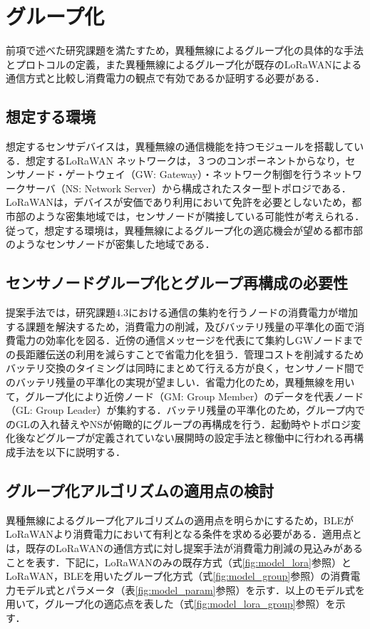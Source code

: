 \section{グループ化}
前項で述べた研究課題を満たすため，異種無線によるグループ化の具体的な手法とプロトコルの定義，また異種無線によるグループ化が既存のLoRaWANによる通信方式と比較し消費電力の観点で有効であるか証明する必要がある．

\subsection{想定する環境}
想定するセンサデバイスは，異種無線の通信機能を持つモジュールを搭載している．想定するLoRaWAN ネットワークは，３つのコンポーネントからなり，センサノード・ゲートウェイ（GW: Gateway）・ネットワーク制御を行うネットワークサーバ（NS: Network Server）から構成されたスター型トポロジである．LoRaWANは，デバイスが安価であり利用において免許を必要としないため，都市部のような密集地域では，センサノードが隣接している可能性が考えられる．従って，想定する環境は，異種無線によるグループ化の適応機会が望める都市部のようなセンサノードが密集した地域である．

\subsection{センサノードグループ化とグループ再構成の必要性}
提案手法では，研究課題4.3における通信の集約を行うノードの消費電力が増加する課題を解決するため，消費電力の削減，及びバッテリ残量の平準化の面で消費電力の効率化を図る．近傍の通信メッセージを代表にて集約しGWノードまでの長距離伝送の利用を減らすことで省電力化を狙う．管理コストを削減するためバッテリ交換のタイミングは同時にまとめて行える方が良く，センサノード間でのバッテリ残量の平準化の実現が望ましい．省電力化のため，異種無線を用いて，グループ化により近傍ノード（GM: Group Member）のデータを代表ノード（GL: Group Leader）が集約する．バッテリ残量の平準化のため，グループ内でのGLの入れ替えやNSが俯瞰的にグループの再構成を行う．起動時やトポロジ変化後などグループが定義されていない展開時の設定手法と稼働中に行われる再構成手法を以下に説明する．

\subsection{グループ化アルゴリズムの適用点の検討}
異種無線によるグループ化アルゴリズムの適用点を明らかにするため，BLEがLoRaWANより消費電力において有利となる条件を求める必要がある．適用点とは，既存のLoRaWANの通信方式に対し提案手法が消費電力削減の見込みがあることを表す．下記に，LoRaWANのみの既存方式（式\ref{fig:model_lora}参照）とLoRaWAN，BLEを用いたグループ化方式（式\ref{fig:model_group}参照）の消費電力モデル式とパラメータ（表\ref{fig:model_param}参照）を示す．以上のモデル式を用いて，グループ化の適応点を表した（式\ref{fig:model_lora_group}参照）を示す．

